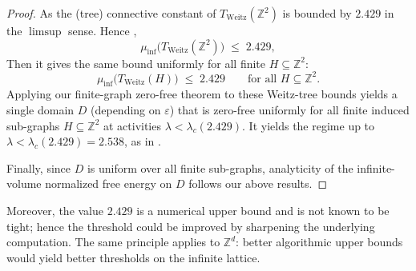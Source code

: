 \documentclass[a4paper,11pt]{article}
\theoremstyle{plain}
\theoremstyle{definition}
\theoremstyle{remark}
\newcommand{\1}{\mathbf{1}}
\begin{document}
\begin{proof}
As the (tree) connective constant of $T_{\mathrm{Weitz}}(\mathbb{Z}^2)$ is bounded by $2.429$ in the $\limsup$ sense. Hence ,
\begin{equation}
  \mu_{\inf}\!\bigl(T_{\mathrm{Weitz}}(\mathbb{Z}^2)\bigr)\;\le\;2.429,
\end{equation}
Then it gives the same bound uniformly for all finite
$H\subseteq\mathbb{Z}^2$:
\begin{equation}
  \mu_{\inf}\!\bigl(T_{\mathrm{Weitz}}(H)\bigr)\;\le\;2.429 \qquad \text{for all } H\subseteq\mathbb{Z}^2.
\end{equation}
Applying our finite-graph zero-free theorem to these Weitz-tree bounds yields a single domain $D$ (depending on
$\varepsilon$) that is zero-free uniformly for all finite induced sub-graphs $H\subseteq\mathbb{Z}^2$ at activities
$\lambda<\lambda_c(2.429)$. It yields the regime up to
$\lambda<\lambda_c(2.429)=2.538$, as in \cite[App.~A]{sinclair2017spatial}. 

Finally, since $D$ is uniform over all finite sub-graphs, analyticity of the infinite-volume normalized free energy
on $D$ follows our above results. 
\end{proof}

Moreover, the value $2.429$ is a numerical upper bound and is not known to be tight; hence the threshold could be improved by sharpening the underlying computation. The same principle applies to $\mathbb{Z}^d$: better algorithmic upper bounds would yield better thresholds on the infinite lattice.








\end{document}
